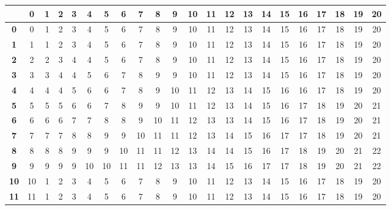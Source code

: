 \documentclass[10pt]{article}
\begin{document}
\pagestyle{empty}

\setlength\extrarowheight{5pt}

\begin{table}[ht]
  \centering
  \begin{tabu}{|>{\bfseries}c|ccc|ccc|ccc|ccc|ccc|ccc|ccc|}\hline

    \rowfont{\bfseries}
       & 0  & 1 & 2 & 3 & 4 & 5 & 6 & 7 & 8 & 9 & 10 & 11 & 12 & 13 & 14 & 15 & 16 & 17 & 18 & 19 & 20\\\hline

    0  & 0  & 1 & 2 & 3 & 4 & 5 & 6 & 7 & 8 & 9 & 10 & 11 & 12 & 13 & 14 & 15 & 16 & 17 & 18 & 19 & 20\\
    1  & 1  & 1 & 2 & 3 & 4 & 5 & 6 & 7 & 8 & 9 & 10 & 11 & 12 & 13 & 14 & 15 & 16 & 17 & 18 & 19 & 20\\
    2  & 2  & 2 & 3 & 4 & 4 & 5 & 6 & 7 & 8 & 9 & 10 & 11 & 12 & 13 & 14 & 15 & 16 & 17 & 18 & 19 & 20\\

    3  & 3  & 3 & 4 & 4 & 5 & 6 & 7 & 8 & 9 & 9 & 10 & 11 & 12 & 13 & 14 & 15 & 16 & 17 & 18 & 19 & 20\\
    4  & 4  & 4 & 4 & 5 & 6 & 6 & 7 & 8 & 9 & 10 & 11 & 12 & 13 & 14 & 15 & 16 & 16 & 17 & 18 & 19 & 20\\
    5  & 5  & 5 & 5 & 6 & 6 & 7 & 8 & 9 & 9 & 10 & 11 & 12 & 13 & 14 & 15 & 16 & 17 & 18 & 19 & 20 & 21\\

    6  & 6  & 6 & 6 & 7 & 7 & 8 & 8 & 9 & 10 & 11 & 12 & 13 & 13 & 14 & 15 & 16 & 17 & 18 & 19 & 20 & 21\\
    7  & 7  & 7 & 7 & 8 & 8 & 9 & 9 & 10 & 11 & 11 & 12 & 13 & 14 & 15 & 16 & 17 & 17 & 18 & 19 & 20 & 21\\
    8  & 8  & 8 & 8 & 9 & 9 & 9 & 10 & 11 & 11 & 12 & 13 & 14 & 14 & 15 & 16 & 17 & 18 & 19 & 20 & 21 & 22\\

    9  & 9  & 9 & 9 & 9 & 10 & 10 & 11 & 11 & 12 & 13 & 13 & 14 & 15 & 16 & 17 & 17 & 18 & 19 & 20 & 21 & 22\\
    10 & 10 & 1 & 2 & 3 & 4 & 5 & 6 & 7 & 8 & 9 & 10 & 11 & 12 & 13 & 14 & 15 & 16 & 17 & 18 & 19 & 20\\
    11 & 11 & 1 & 2 & 3 & 4 & 5 & 6 & 7 & 8 & 9 & 10 & 11 & 12 & 13 & 14 & 15 & 16 & 17 & 18 & 19 & 20\\


\end{tabu}
\end{table}
\end{document}
